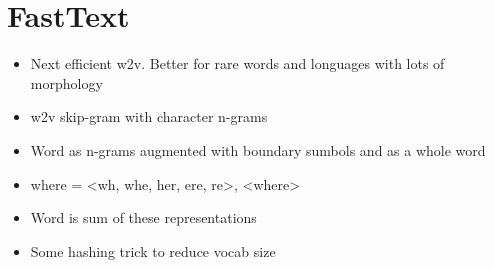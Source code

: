 \documentclass[a4paper]{article}
\begin{document}
\section{FastText}
\begin{itemize}
    \item Next efficient w2v. Better for rare words and longuages with lots of morphology
    \item w2v skip-gram with character n-grams
    \item Word as n-grams augmented with boundary sumbols and as a whole word
    \item where = <wh, whe, her, ere, re>, <where>
    \item Word is sum of these representations
    \item Some hashing trick to reduce vocab size
\end{itemize}
\end{document}
